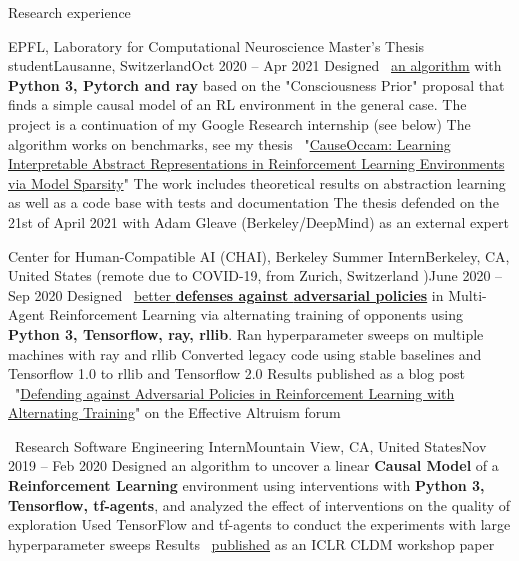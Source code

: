 \documentclass{resume} %
\newcommand*{\img}[1]{%
	\raisebox{-.02\baselineskip}{%
		\texttt{[image: \#1]}%
	}%
}
\newcommand*{\emoji}[1]{\img{./emoji/#1.png}}
\newcommand*{\logo}[1]{%
	\raisebox{-.02\baselineskip}{%
		\texttt{[image: ./img/\#1]}%
	}%
}
\newcommand{\mylink}{{\color{gray}\faExternalLink}}
\begin{document}
\begin{rSection}{Research experience}			  
	\begin{rSubsection}{EPFL, Laboratory for Computational Neuroscience \emoji{flag-ch}}{Master's Thesis student}{Lausanne, Switzerland}{Oct 2020 -- Apr 2021}
		\myitem Designed \mylink~\href{https://github.com/sergia-ch/causality-disentanglement-rl}{an algorithm} with {\bf Python 3, Pytorch and ray} based on the "Consciousness Prior" proposal that finds a simple causal model of an RL environment in the general case. The project is a continuation of my Google Research internship (see below)
		\myitem The algorithm works on benchmarks, see my thesis \mylink~"\href{https://sergia-ch.github.io/causality-simplicity/CauseOccam_Learning_Interpretable_Abstract_Representations_in_Reinforcement_Learning_Environments_via_Model_Sparsity.pdf}{CauseOccam: Learning Interpretable Abstract Representations in
			Reinforcement Learning Environments via Model Sparsity}"
		\myitem The work includes theoretical results on abstraction learning as well as a code base with tests and documentation
		\myitem The thesis defended on the 21st of April 2021 with Adam Gleave (Berkeley/DeepMind) as an external expert
	\end{rSubsection}
	
	\begin{rSubsection}{\logo{chai-logo.png} \logo{UCBerkeley.png} Center for Human-Compatible AI (CHAI), Berkeley \emoji{flag-us}}{Summer Intern}{Berkeley, CA, United States (remote due to COVID-19, from Zurich, Switzerland \emoji{flag-ch})}{June 2020 -- Sep 2020}
		\myitem Designed \mylink~\href{https://github.com/HumanCompatibleAI/better-adversarial-defenses/} {better {\bf defenses against {\bf adversarial policies}}} in Multi-Agent Reinforcement Learning via alternating training of opponents using {\bf Python 3, Tensorflow, ray, rllib}.
		\myitem Ran hyperparameter sweeps on multiple machines with ray and rllib
		\myitem Converted legacy code using stable baselines and Tensorflow 1.0 to rllib and Tensorflow 2.0
		\myitem Results published as a blog post \mylink~"\href{https://forum.effectivealtruism.org/posts/YscrJFofd6S8eJGS8/defending-against-adversarial-policies-in-reinforcement}{Defending against Adversarial Policies in Reinforcement Learning with Alternating Training}" on the Effective Altruism forum
	\end{rSubsection}


	\begin{rSubsection}{{\large\vspace*{-0.7mm}\google}\ Research \emoji{flag-us}}{Software Engineering Intern}{Mountain View, CA, United States}{Nov 2019 -- Feb 2020}
		\myitem Designed an algorithm to uncover a linear {\bf Causal Model} of a {\bf Reinforcement Learning} environment using interventions with {\bf Python 3, Tensorflow, tf-agents}, and analyzed the effect of interventions on the quality of exploration
		\myitem Used TensorFlow and tf-agents to conduct the experiments with large hyperparameter sweeps
		\myitem Results \mylink~\href{https://arxiv.org/abs/2002.05217}{published} as an ICLR CLDM workshop paper
	\end{rSubsection}



\end{rSection}
\end{document}
